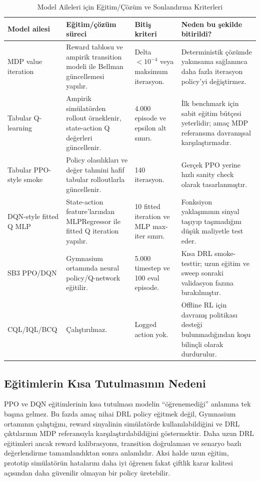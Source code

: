 \documentclass[conference]{IEEEtran}
\begin{document}
\begin{table}[!t]
\caption{Model Aileleri için Eğitim/Çözüm ve Sonlandırma Kriterleri}
\label{tab:run_stop_criteria}
\centering
\begin{tabular}{p{}p{}p{}p{}}
\toprule
Model ailesi & Eğitim/çözüm süreci & Bitiş kriteri & Neden bu şekilde bitirildi? \\
\midrule
MDP value iteration & Reward tablosu ve ampirik transition modeli ile Bellman
güncellemesi yapılır. & Delta \(<10^{-4}\) veya maksimum iterasyon. & Deterministik
çözümde yakınsama sağlanınca daha fazla iterasyon policy'yi değiştirmez. \\
Tabular Q-learning & Ampirik simülatörden rollout örneklenir, state-action Q
değerleri güncellenir. & 4.000 episode ve epsilon alt sınırı. & İlk benchmark için
sabit eğitim bütçesi yeterlidir; amaç MDP referansına davranışsal karşılaştırmadır. \\
Tabular PPO-style smoke & Policy olasılıkları ve değer tahmini hafif tabular
rolloutlarla güncellenir. & 140 iterasyon. & Gerçek PPO yerine hızlı sanity check
olarak tasarlanmıştır. \\
DQN-style fitted Q MLP & State-action feature'larından MLPRegressor ile fitted Q
iteration yapılır. & 10 fitted iteration ve MLP max-iter sınırı. & Fonksiyon
yaklaşımının sinyal taşıyıp taşımadığını düşük maliyetle test eder. \\
SB3 PPO/DQN & Gymnasium ortamında neural policy/Q-network eğitilir. & 5.000
timestep ve 100 eval episode. & Kısa DRL smoke-testtir; uzun eğitim ve sweep
sonraki validasyon fazına bırakılmıştır. \\
CQL/IQL/BCQ & Çalıştırılmaz. & Logged action yok. & Offline RL için davranış
politikası desteği bulunmadığından koşu bilinçli olarak durdurulur. \\
\bottomrule
\end{tabular}
\end{table}

\subsection{Eğitimlerin Kısa Tutulmasının Nedeni}
PPO ve DQN eğitimlerinin kısa tutulması modelin ``öğrenemediği'' anlamına tek
başına gelmez. Bu fazda amaç nihai DRL policy eğitmek değil, Gymnasium ortamının
çalıştığını, reward sinyalinin simülatörde kullanılabildiğini ve DRL çıktılarının
MDP referansıyla karşılaştırılabildiğini göstermektir. Daha uzun DRL eğitimleri
ancak reward kalibrasyonu, transition doğrulaması ve senaryo bazlı değerlendirme
tamamlandıktan sonra anlamlıdır. Aksi halde uzun eğitim, prototip simülatörün
hatalarını daha iyi öğrenen fakat çiftlik karar kalitesi açısından daha güvenilir
olmayan bir policy üretebilir.
\end{document}
